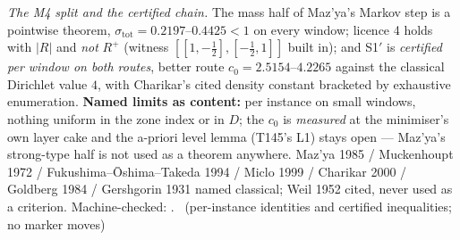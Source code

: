 \documentclass[11pt,a4paper]{article}
\theoremstyle{definition}
\begin{document}
\emph{The M4 split and the certified chain.} The mass half of Maz'ya's Markov
step is a pointwise theorem, $\sigma_{\mathrm{tot}}=0.2197$--$0.4425<1$ on every
window; licence 4 holds with $|R|$ and \emph{not} $R^{+}$ (witness
$[[1,-\tfrac12],[-\tfrac12,1]]$ built in); and S1$'$ is \emph{certified per
window on both routes}, better route $c_0=2.5154$--$4.2265$ against the
classical Dirichlet value $4$, with Charikar's cited density constant bracketed
by exhaustive enumeration.
\textbf{Named limits as content:} per instance on small windows, nothing uniform
in the zone index or in $D$; the $c_0$ is \emph{measured} at the minimiser's own
layer cake and the a-priori level lemma (T145's L1) stays open --- Maz'ya's
strong-type half is not used as a theorem anywhere.
Maz'ya 1985 / Muckenhoupt 1972 / Fukushima--\=Oshima--Takeda 1994 / Miclo 1999 /
Charikar 2000 / Goldberg 1984 / Gershgorin 1931 named classical; Weil 1952
cited, never used as a criterion.
Machine-checked:
.
\mE\ (per-instance identities and certified inequalities; no marker moves)
\end{document}
